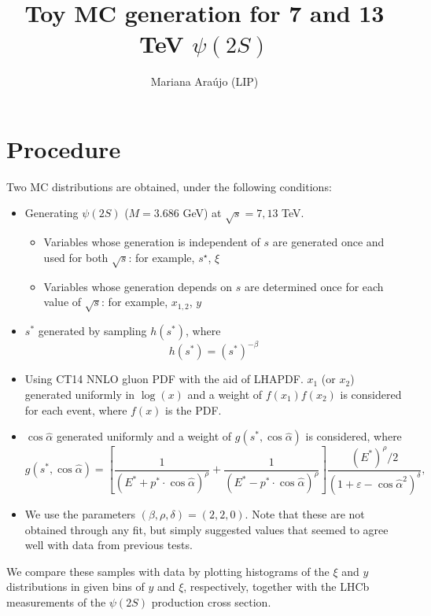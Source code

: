 \documentclass{article}
\begin{document}
\title{Toy MC generation for 7 and 13 TeV $\psi(2S)$}
\author{Mariana Ara\'ujo (LIP)}
\maketitle

\section{Procedure}

Two MC distributions are obtained, under the following conditions:
\begin{itemize}
\item Generating $\psi(2S)$ ($M=3.686$ GeV) at $\sqrt{s}=7,13$ TeV.
\begin{itemize}
\item Variables whose generation is independent of $s$ are generated once and used for both $\sqrt{s}$: for example, $s^\star$, $\xi$
\item Variables whose generation depends on $s$ are determined once for each value of $\sqrt{s}$: for example, $x_{1,2}$, $y$
\end{itemize}
\item $s^*$ generated by sampling $h(s^*)$, where
$$ h(s^*) = \left(s^*\right)^{-\beta}$$
\item Using CT14 NNLO gluon PDF with the aid of LHAPDF. $x_1$ (or $x_2$) generated uniformly in $\log(x)$ and a weight of $f(x_1)f(x_2)$ is considered for each event, where $f(x)$ is the PDF.
\item $\cos\hat\alpha$ generated uniformly and a weight of $g(s^*, \cos\hat\alpha)$ is considered, where
$$g(s^*, \cos\hat\alpha) = \left[\frac{1}{(E^*+p^*\cdot\cos\hat\alpha)^\rho}+\frac{1}{(E^*-p^*\cdot\cos\hat\alpha)^\rho}\right]\frac{(E^*)^\rho/2}{(1+\varepsilon-\cos\hat\alpha^2)^\delta},$$
\item We use the parameters $(\beta, \rho, \delta) = (2, 2, 0)$. Note that these are not obtained through any fit, but simply suggested values that seemed to agree well with data from previous tests.
\end{itemize}

We compare these samples with data by plotting histograms of the $\xi$ and $y$ distributions in given bins of $y$ and $\xi$, respectively, together with the LHCb measurements of the $\psi(2S)$ production cross section.
\end{document}
